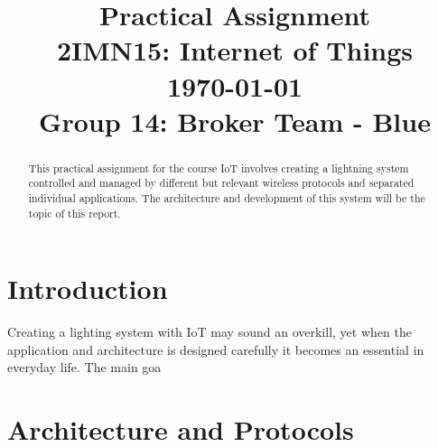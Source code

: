 \documentclass[conference]{IEEEtran}
\begin{document}
\title{Practical Assignment\\ {\fontsize{13}{0}\selectfont 2IMN15: Internet of Things } \\ {\fontsize{13}{0}\selectfont \today }\\{ \fontsize{13}{0}\selectfont Group 14: Broker Team - Blue}}

\author{
	\and
	}
\maketitle

\IEEEpeerreviewmaketitle


\begin{abstract}
	This practical assignment for the course IoT involves creating a lightning system controlled and managed by different but relevant wireless protocols and separated individual applications. The architecture and development of this system will be the topic of this report.\\
	
\end{abstract}


\section{Introduction}

Creating a lighting system with IoT may sound an overkill, yet when the application and architecture is designed carefully it becomes an essential in everyday life. The main goa



\section{Architecture and Protocols}
\end{document}

